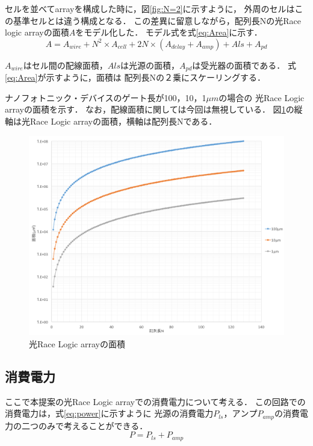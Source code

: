 セルを並べてarrayを構成した時に，図\ref{fig:N=2}に示すように，
外周のセルはこの基準セルとは違う構成となる．
この差異に留意しながら，配列長Nの光Race logic arrayの面積$A$をモデル化した．
モデル式を式\ref{eq:Area}に示す．
\begin{equation}
A = A_{wire}+N^2 \times A_{cell} + 2N \times (A_{delay}+A_{amp}) +A{ls}+A_{pd}
\label{eq:Area}
\end{equation}

$A_{wire}はセル間の配線面積，A{ls}は光源の面積，A_{pd}は受光器の面積である．$
式\ref{eq:Area}が示すように，面積は
配列長Nの２乗にスケーリングする．

ナノフォトニック・デバイスのゲート長が100，10，1$\mu m$の場合の
光Race Logic arrayの面積を示す．
なお，配線面積に関しては今回は無視している．
図\ref{fig:nanoArea}の縦軸は光Race Logic arrayの面積，横軸は配列長Nである．
\begin{figure}[t!]
\begin{center}
\includegraphics[keepaspectratio,scale=0.5]{fig/4/nanoArea.png}
\caption{光Race Logic arrayの面積}
\label{fig:nanoArea}
\end{center}
\end{figure}

\subsection{消費電力}
ここで本提案の光Race Logic arrayでの消費電力について考える．
この回路での消費電力は，式\ref{eq:power}に示すように
$光源の消費電力P_{ls}$，$アンプP_{amp}$の消費電力の二つのみで考えることができる．
\begin{equation}
P=P_{ls}+P_{amp}
\label{eq:power}
\end{equation}

